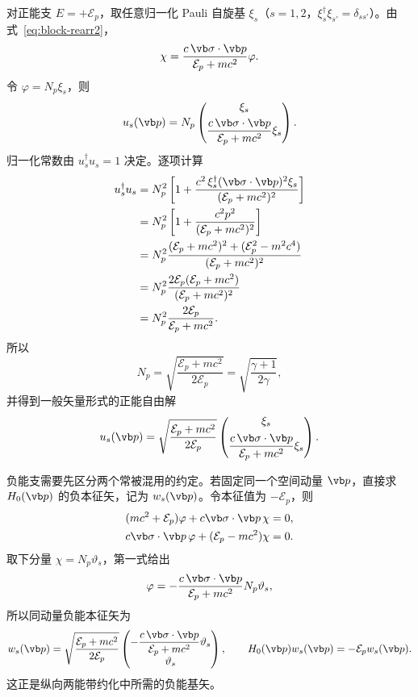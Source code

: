对正能支 $E=+\mathcal E_p$，取任意归一化 Pauli 自旋基 $\xi_s$（$s=1,2$，$\xi_s^\dagger\xi_{s'}=\delta_{ss'}$）。由式~\cref{eq:block-rearr2}，
\begin{equation}
 \chi=\frac{c\,\vb\sigma\cdot\vb p}{\mathcal E_p+mc^2}\varphi.
\end{equation}
令 $\varphi=N_p\xi_s$，则
\begin{equation}
 u_s(\vb p)
 =N_p
 \begin{pmatrix}
 \xi_s\\[0.35em]
 \dfrac{c\,\vb\sigma\cdot\vb p}{\mathcal E_p+mc^2}\xi_s
 \end{pmatrix}.
 \label{eq:u-general-unnorm}
\end{equation}
归一化常数由 $u_s^\dagger u_s=1$ 决定。逐项计算
\begin{align}
 u_s^\dagger u_s
 &=N_p^2\left[
 1+\frac{c^2\,\xi_s^\dagger(\vb\sigma\cdot\vb p)^2\xi_s}
 {(\mathcal E_p+mc^2)^2}\right]\\
 &=N_p^2\left[
 1+\frac{c^2p^2}{(\mathcal E_p+mc^2)^2}\right]\\
 &=N_p^2\frac{(\mathcal E_p+mc^2)^2+(\mathcal E_p^2-m^2c^4)}{(\mathcal E_p+mc^2)^2}\\
 &=N_p^2\frac{2\mathcal E_p(\mathcal E_p+mc^2)}{(\mathcal E_p+mc^2)^2}\\
 &=N_p^2\frac{2\mathcal E_p}{\mathcal E_p+mc^2}.
\end{align}
所以
\begin{equation}
 N_p=\sqrt{\frac{\mathcal E_p+mc^2}{2\mathcal E_p}}
 =\sqrt{\frac{\gamma+1}{2\gamma}},
\end{equation}
并得到一般矢量形式的正能自由解
\begin{equation}
 {
 u_s(\vb p)=
 \sqrt{\frac{\mathcal E_p+mc^2}{2\mathcal E_p}}
 \begin{pmatrix}
 \xi_s\\[0.45em]
 \dfrac{c\,\vb\sigma\cdot\vb p}{\mathcal E_p+mc^2}\xi_s
 \end{pmatrix}.}
 \label{eq:u-general}
\end{equation}

负能支需要先区分两个常被混用的约定。若固定同一个空间动量 $\vb p$，直接求 $H_0(\vb p)$ 的负本征矢，记为 $w_s(\vb p)$。令本征值为 $-\mathcal E_p$，则
\begin{align}
(mc^2+\mathcal E_p)\varphi+c\vb\sigma\cdot\vb p\,\chi&=0,\\
c\vb\sigma\cdot\vb p\,\varphi+(\mathcal E_p-mc^2)\chi&=0.
\end{align}
取下分量 $\chi=N_p\vartheta_s$，第一式给出
\begin{equation}
\varphi=-\frac{c\,\vb\sigma\cdot\vb p}{\mathcal E_p+mc^2}N_p\vartheta_s,
\end{equation}
所以同动量负能本征矢为
\begin{equation}
{
w_s(\vb p)=
\sqrt{\frac{\mathcal E_p+mc^2}{2\mathcal E_p}}
\begin{pmatrix}
-\dfrac{c\,\vb\sigma\cdot\vb p}{\mathcal E_p+mc^2}\vartheta_s\\[0.45em]
\vartheta_s
\end{pmatrix},
\qquad
H_0(\vb p)w_s(\vb p)=-\mathcal E_p w_s(\vb p).}
\label{eq:w-negative-same-momentum}
\end{equation}
这正是纵向两能带约化中所需的负能基矢。

